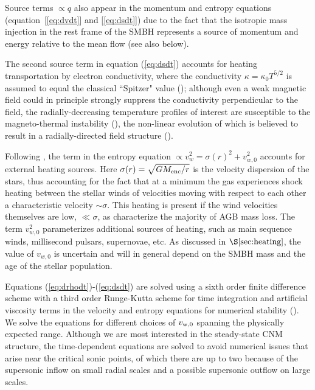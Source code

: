 \documentclass[usenatbib,fleqn]{mn2e}
\newcommand{\vw}{v_w}
\begin{document}
Source terms $\propto q$ also appear in the momentum and entropy
equations (equation~[\ref{eq:dvdt}] and [\ref{eq:dsdt}]) due to the fact
that the isotropic mass injection in the rest frame of the SMBH
represents a source of momentum and energy relative to the mean flow (see also below).  

The second source term in equation (\ref{eq:dsdt}) accounts for heating transportation by electron conductivity, where the conductivity $\kappa = \kappa_0 T^{5/2}$ is assumed to equal the classical ``Spitzer" value (\citealt{Spitzer62}); although even a weak magnetic field could in principle strongly suppress the conductivity perpendicular to the field, the radially-decreasing temperature profiles of interest are susceptible to the magneto-thermal instability (\citealt{Balbus01}), the non-linear evolution of which is believed to result in a radially-directed field structure (\citealt{Parrish&Stone07}).

Following \citet{ShcherbakovWong+:2014a}, the term in the entropy
equation $\propto \vw^2 = \sigma(r)^2+v_{w,0}^2$ accounts for external
heating sources.  Here $\sigma(r) = \sqrt{GM_{\rm enc}/r}$ is the
velocity dispersion of the stars, thus accounting for the fact that at
a minimum the gas experiences shock heating between the stellar winds
of velocities moving with respect to each other a characteristic
velocity $\sim \sigma$.  This heating is present if the wind velocities themselves
are low, $\ll \sigma$, as characterize the majority of AGB mass loss.
The term $v_{w,0}^{2}$ parameterizes additional sources of heating,
such as main sequence winds, millisecond pulsars, supernovae, etc.  As
discussed in $\S\ref{sec:heating}$, the value of $v_{w,0}$ is
uncertain and will in general depend on the SMBH mass and the age of
the stellar population.

Equations (\ref{eq:drhodt})-(\ref{eq:dsdt}) are solved using a sixth
order finite difference scheme with a third order Runge-Kutta scheme
for time integration and artificial viscosity terms in the velocity
and entropy equations for numerical stability (\citealt{Brandenburg:2003a}).  We solve the equations for
different choices of $v_{\rm w,0}$ spanning the physically expected
range.  Although we are most interested in the steady-state CNM
structure, the time-dependent equations are solved to avoid numerical
issues that arise near the critical sonic points, of which there are
up to two because of the supersonic inflow on small radial scales and
a possible supersonic outflow on large scales.
\end{document}
